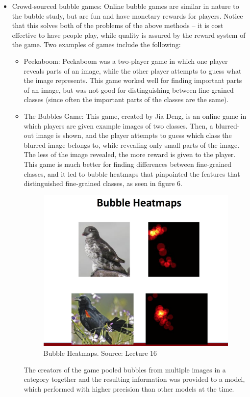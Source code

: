 \documentclass[11pt]{article}
\begin{document}
\begin{itemize}
\item Crowd-sourced bubble games: Online bubble games are similar in nature to the bubble study, but are fun and have monetary rewards for players. Notice that this solves both of the problems of the above methods -- it is cost effective to have people play, while quality is assured by the reward system of the game. Two examples of games include the following:
\begin{itemize}
\item Peekaboom: Peekaboom was a two-player game in which one player reveals parts of an image, while the other player attempts to guess what the image represents. This game worked well for finding important parts of an image, but was not good for distinguishing between fine-grained classes (since often the important parts of the classes are the same).
\item The Bubbles Game: This game, created by Jia Deng, is an online game in which players are given example images of two classes. Then, a blurred-out image is shown, and the player attempts to guess which class the blurred image belongs to, while revealing only small parts of the image. The less of the image revealed, the more reward is given to the player. This game is much better for finding differences between fine-grained classes, and it led to bubble heatmaps that pinpointed the features that distinguished fine-grained classes, as seen in figure 6.
\begin{figure}[h]
  \centering
  \includegraphics[scale=0.6]{heatmap.png} 
  \caption{Bubble Heatmaps. Source: Lecture 16}
\end{figure}
The creators of the game pooled bubbles from multiple images in a category together and the resulting information was provided to a model, which performed with higher precision than other models at the time.
\end{itemize}
\end{itemize}
\end{document}
